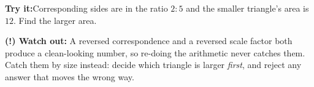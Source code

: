 \documentclass[12pt]{article}
\begin{document}
\begin{tryitbox}
\textbf{Try it:}\quad Corresponding sides are in the ratio $2 : 5$ and the smaller
triangle's area is $12$. Find the larger area.\\[2pt]
\end{tryitbox}

\begin{watchoutbox}
\textbf{(!) Watch out:} A reversed correspondence and a reversed scale factor both
produce a clean-looking number, so re-doing the arithmetic never catches them.
Catch them by size instead: decide which triangle is larger \emph{first}, and
reject any answer that moves the wrong way.
\end{watchoutbox}
\end{document}
